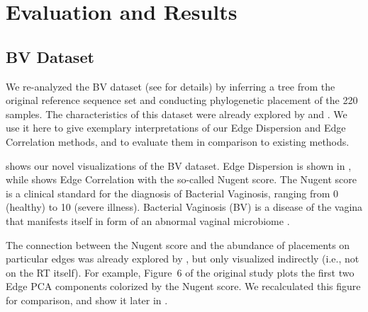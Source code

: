 
\section{Evaluation and Results}
\label{ch:Visualization:sec:Results}


\subsection{BV Dataset}
\label{ch:Visualization:sec:Results:sub:BVDataset}

We re-analyzed the \acf{BV} dataset (see  for details)
by inferring a tree from the original reference sequence set
and conducting phylogenetic placement of the \num{220} samples.
The characteristics of this dataset were already explored by  and .
We use it here to give exemplary interpretations of our Edge Dispersion and Edge Correlation methods,
and to evaluate them in comparison to existing methods.

 shows our novel visualizations of the \ac{BV} dataset.
Edge Dispersion is shown in ,
while  shows Edge Correlation with the so-called Nugent score. %
The Nugent score \cite{Nugent1991} is a clinical standard for the diagnosis of Bacterial Vaginosis,
ranging from \num{0} (healthy) to \num{10} (severe illness).
Bacterial Vaginosis (BV) is a disease of the vagina
that manifests itself in form of an abnormal vaginal microbiome \cite{Srinivasan2012}.

The connection between the Nugent score and the abundance of placements on particular edges
was already explored by , but only visualized indirectly (i.e., not on the \ac{RT} itself).
For example, Figure~6 of the original study plots the first two Edge PCA components colorized by the Nugent score.
We recalculated this figure for comparison, and show it later in .

